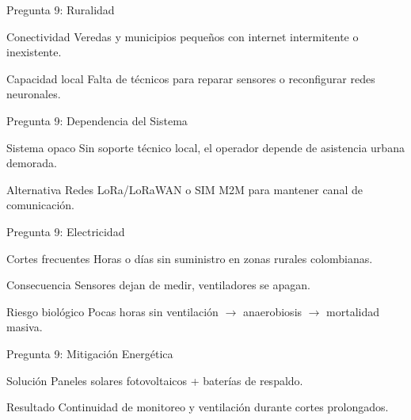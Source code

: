 \documentclass[aspectratio=169, 11pt]{beamer}
\begin{document}
\begin{frame}{Pregunta 9: Ruralidad}
\begin{alertblock}{Conectividad}
\footnotesize
Veredas y municipios pequeños con internet intermitente o inexistente.
\end{alertblock}
\begin{block}{Capacidad local}
\footnotesize
Falta de técnicos para reparar sensores o reconfigurar redes neuronales.
\end{block}
\end{frame}

\begin{frame}{Pregunta 9: Dependencia del Sistema}
\begin{alertblock}{Sistema opaco}
\footnotesize
Sin soporte técnico local, el operador depende de asistencia urbana demorada.
\end{alertblock}
\begin{exampleblock}{Alternativa}
\footnotesize
Redes LoRa/LoRaWAN o SIM M2M para mantener canal de comunicación.
\end{exampleblock}
\end{frame}

\begin{frame}{Pregunta 9: Electricidad}
\begin{alertblock}{Cortes frecuentes}
\footnotesize
Horas o días sin suministro en zonas rurales colombianas.
\end{alertblock}
\begin{block}{Consecuencia}
\footnotesize
Sensores dejan de medir, ventiladores se apagan.
\end{block}
\begin{alertblock}{Riesgo biológico}
\footnotesize
Pocas horas sin ventilación $\rightarrow$ anaerobiosis $\rightarrow$ mortalidad masiva.
\end{alertblock}
\end{frame}

\begin{frame}{Pregunta 9: Mitigación Energética}
\begin{exampleblock}{Solución}
\footnotesize
Paneles solares fotovoltaicos + baterías de respaldo.
\end{exampleblock}
\begin{block}{Resultado}
\footnotesize
Continuidad de monitoreo y ventilación durante cortes prolongados.
\end{block}
\end{frame}
\end{document}
